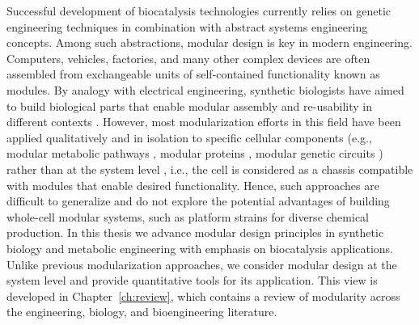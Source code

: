 Successful development of biocatalysis technologies currently relies on genetic engineering techniques in combination with abstract systems engineering concepts.
Among such abstractions, modular design is key in modern engineering.
Computers, vehicles, factories, and many other complex devices are often assembled from exchangeable units of self-contained functionality known as modules.
By analogy with electrical engineering, synthetic biologists have aimed to build biological parts that enable modular assembly and re-usability in different contexts \citep{shetty2008}.
However, most modularization efforts in this field have been applied qualitatively and in isolation to specific cellular components (e.g., modular metabolic pathways \citep{biggs2014}, modular proteins \citep{maervoet2017}, modular genetic circuits \citep{slusarczyk2012}) rather than at the system level \citep{purnick2009}, i.e., the cell is considered as a chassis compatible with modules that enable desired functionality. %
Hence, such approaches are difficult to generalize and do not explore the potential advantages of building whole-cell modular systems, such as platform strains \citep{nielsen2016} for diverse chemical production.
In this thesis we advance modular design principles in synthetic biology and metabolic engineering with emphasis on biocatalysis applications.
Unlike previous modularization approaches, we consider modular design at the system level and provide quantitative tools for its application.
This view is developed in Chapter~\ref{ch:review}, which contains a review of modularity across the engineering, biology, and bioengineering literature.



